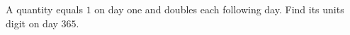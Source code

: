 A quantity equals $1$ on day one and doubles each following day. Find its units digit on day $365$.
